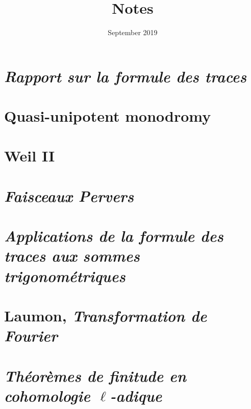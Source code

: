 \documentclass[12pt, fleqn, oneside, reqno]{amsbook}
\title{Notes}
\date{September 2019}
\theoremstyle{definition}
\theoremstyle{remark}
\begin{document}
\maketitle
{\setlength{\parskip}{0.5em}\small\tableofcontents\par}

\section{\emph{Rapport sur la formule des traces}}


\newpage
\setcounter{section}{1}
\section{Quasi-unipotent monodromy}


\newpage
\setcounter{section}{2}
\section{Weil II}


\newpage
\section{\emph{Faisceaux Pervers}}


\newpage
\section{\emph{Applications de la formule des traces aux sommes trigonométriques}}\label{sec:sommes_trig}


\newpage
\section{Laumon, \emph{Transformation de Fourier}}
\label{sec:laumon}

\newpage
\section{\emph{Théorèmes de finitude en
cohomologie $\ell$-adique}}\label{sec:thfin}

\end{document}

